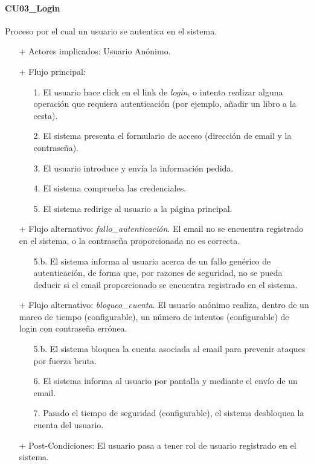\documentclass[a4paper,12pt,twoside,openright]{report}
\begin{document}
            \paragraph{CU03\_Login}
                Proceso por el cual un usuario se autentica en el sistema.
                \begin{itemize}
                    \item[+] Actores implicados: Usuario Anónimo.
                    \item[+] Flujo principal:
                    \begin{enumerate}
                        \item[1.] El usuario hace click en el link de \emph{login}, o intenta realizar alguna operación que requiera autenticación (por ejemplo, añadir un libro a la cesta).
                        \item[2.] El sistema presenta el formulario de acceso (dirección de email y la contraseña).
                        \item[3.] El usuario introduce y envía la información pedida.
                        \item[4.] El sistema comprueba las credenciales.
                        \item[5.] El sistema redirige al usuario a la página principal.
                    \end{enumerate}
                    \item[+] Flujo alternativo: \emph{fallo\_autenticación}. El email no se encuentra registrado en el sistema, o la contraseña proporcionada no es correcta.
                    \begin{itemize}
                        \item[5.b.] El sistema informa al usuario acerca de un fallo genérico de autenticación, de forma que, por razones de seguridad, no se pueda deducir si el email proporcionado se encuentra registrado en el sistema.
                    \end{itemize}
                    \item[+] Flujo alternativo: \emph{bloqueo\_cuenta}. El usuario anónimo realiza, dentro de un marco de tiempo (configurable), un número de intentos (configurable) de login con contraseña errónea.
                    \begin{itemize}
                        \item[5.b.] El sistema bloquea la cuenta asociada al email para prevenir ataques por fuerza bruta.
                        \item[6.] El sistema informa al usuario por pantalla y mediante el envío de un email.
                        \item[7.] Pasado el tiempo de seguridad (configurable), el sistema desbloquea la cuenta del usuario.
                    \end{itemize}
                    \item[+] Post-Condiciones: El usuario pasa a tener rol de usuario registrado en el sistema.
                \end{itemize}
\end{document}
